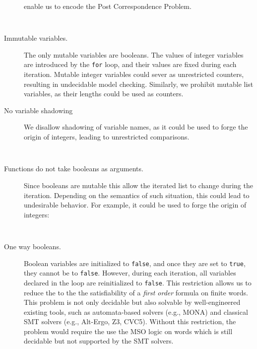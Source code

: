 \begin{description}
          enable us to encode the Post Correspondence Problem.
          \begin{verbatim}
            
          \end{verbatim}
    \item [Immutable variables.] The only mutable variables are booleans.
          The values of integer variables are introduced by the \texttt{for} loop,
          and their values are fixed during each iteration. Mutable integer variables
          could sever as unrestricted counters, resulting in undecidable model checking.
          Similarly, we prohibit mutable list variables, as their lengths could be used 
          as counters. %
    \item [No variable shadowing] We disallow shadowing of variable names, as it could
          be used to forge the origin of integers, leading to unrestricted comparisons.
          \begin{verbatim}
            
          \end{verbatim} 
    \item [Functions do not take booleans as arguments.] Since booleans are mutable
          this allow the iterated list to change during the iteration. Depending on the
          semantics of such situation, this could lead to undesirable behavior. For example, 
          it could be used to forge the origin of integers:
          \begin{verbatim}
            
          \end{verbatim} 
    \item [One way booleans.] Boolean variables are initialized to \texttt{false}, and 
           once they are set to \texttt{true}, they cannot be to \texttt{false}.
           However, during each iteration, all variables declared in the loop are reinitialized to \texttt{false}.
           This restriction allows us to reduce the  to the the satisfiability
           of a \emph{first order} formula on finite words. This problem is not only decidable
           but also solvable by well-engineered existing tools, such as automata-based solvers (e.g., MONA) and classical SMT solvers (e.g., Alt-Ergo, Z3, CVC5).
           Without this restriction, the problem would require the use the MSO logic on words which is still decidable but
           not supported by the SMT solvers.
\end{description}

